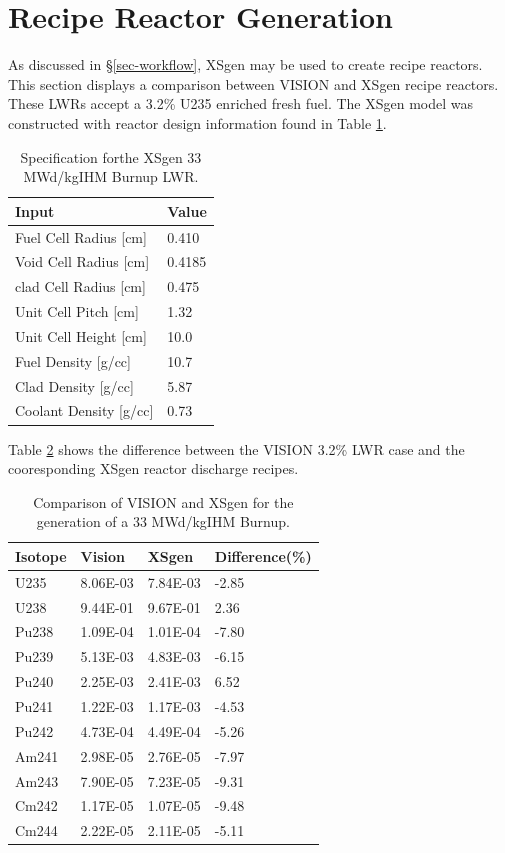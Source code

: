 \documentclass{article}
\begin{document}
\section{Recipe Reactor Generation}
As discussed in \S\ref{sec-workflow}, XSgen may be used to create recipe reactors.
This section displays a comparison between VISION and XSgen recipe reactors. These LWRs accept
a 3.2\% U235 enriched fresh fuel. The XSgen model was constructed with reactor design
information found in Table \ref{tab:xsgenstats}.

\begin{table}[!htb]
\centering
\caption{Specification forthe XSgen 33 MWd/kgIHM Burnup LWR.}
\label{tab:xsgenstats}
\begin{tabular}{|ll|}
\hline
Input & Value \\
\hline
Fuel Cell Radius [cm] & 0.410 \\
Void Cell Radius [cm] & 0.4185 \\
clad Cell Radius [cm] & 0.475 \\
Unit Cell Pitch  [cm] & 1.32 \\
Unit Cell Height [cm] & 10.0 \\
Fuel Density [g/cc] & 10.7 \\
Clad Density [g/cc] & 5.87 \\
Coolant Density [g/cc] & 0.73 \\
\hline
\end{tabular}
\end{table}

Table \ref{tab:recipe} shows the difference between the VISION 3.2\% LWR case and the
cooresponding XSgen reactor discharge recipes.

\begin{table}[!htb]
\centering
\caption{Comparison of VISION and XSgen for the generation of a 33 MWd/kgIHM Burnup.}
\label{tab:recipe}
\begin{tabular}{|l|lll|}
\hline
Isotope & Vision & XSgen & Difference(\%) \\
\hline
U235 & 8.06E-03 & 7.84E-03 & -2.85 \\
U238 & 9.44E-01 & 9.67E-01 & 2.36 \\
Pu238 & 1.09E-04 & 1.01E-04 & -7.80 \\
Pu239 & 5.13E-03 & 4.83E-03 & -6.15 \\
Pu240 & 2.25E-03 & 2.41E-03 & 6.52 \\
Pu241 & 1.22E-03 & 1.17E-03 & -4.53 \\
Pu242 & 4.73E-04 & 4.49E-04 & -5.26 \\
Am241 & 2.98E-05 & 2.76E-05 & -7.97 \\
Am243 & 7.90E-05 & 7.23E-05 & -9.31 \\
Cm242 & 1.17E-05 & 1.07E-05 & -9.48 \\
Cm244 & 2.22E-05 & 2.11E-05 & -5.11 \\
\hline
\end{tabular}
\end{table}
\end{document}
